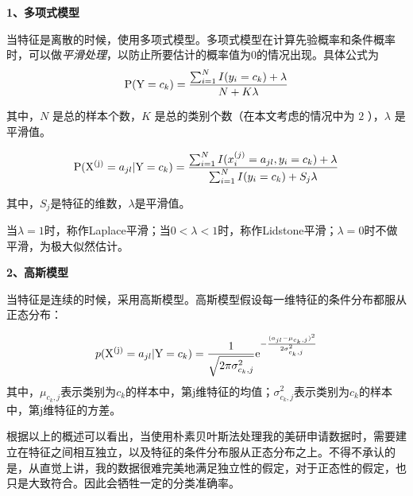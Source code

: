 \documentclass[UTF8,cs4size]{ctexart}
\begin{document}
\noindent \textbf{1、多项式模型}
\par 当特征是离散的时候，使用多项式模型。多项式模型在计算先验概率和条件概率时，可以做\emph{平滑处理}，以防止所要估计的概率值为0的情况出现。具体公式为
\begin{equation}
{\rm P}({\rm Y}=c_k) = \frac{\sum_{i=1}^N I(y_i=c_k)+\lambda}{N+K\lambda}
\end{equation}

\noindent 其中，$N$ 是总的样本个数，$K$ 是总的类别个数（在本文考虑的情况中为 $2$ ），$\lambda$ 是平滑值。

\begin{equation}
{\rm P}({\rm X^{(j)}}=a_{jl}|{\rm Y}=c_k) = \frac{\sum_{i=1}^N I(x_i^{(j)}=a_{jl},y_i=c_k)+\lambda}{\sum_{i=1}^N I(y_i=c_k)+S_j\lambda}
\end{equation}

\noindent 其中，$S_j$是特征的维数，$\lambda$是平滑值。

\par 当$\lambda=1$时，称作Laplace平滑；当$0<\lambda<1$时，称作Lidstone平滑；$\lambda=0$时不做平滑，为极大似然估计。

\vspace{2ex}
\noindent \textbf{2、高斯模型}
\par 当特征是连续的时候，采用高斯模型。高斯模型假设每一维特征的条件分布都服从正态分布：

\begin{equation}
p({\rm X^{(j)}}=a_{jl}|{\rm Y}=c_k) = \frac{1}{\sqrt{2\pi\sigma^2_{c_k,j}}} 
{\rm e}^{- \frac{ (a_{jl}-\mu_{c_k,j})^2 }{ 2\sigma^2_{c_k,j} } }
\end{equation}
\noindent 其中，$\mu_{c_k,j}$表示类别为$c_k$的样本中，第j维特征的均值；$\sigma^2_{c_k,j}$表示类别为$c_k$的样本中，第j维特征的方差。

\vspace{3ex}
\par 根据以上的概述可以看出，当使用朴素贝叶斯法处理我的美研申请数据时，需要建立在特征之间相互独立，以及特征的条件分布服从正态分布之上。不得不承认的是，从直觉上讲，我的数据很难完美地满足独立性的假定，对于正态性的假定，也只是大致符合。因此会牺牲一定的分类准确率。
\end{document}
